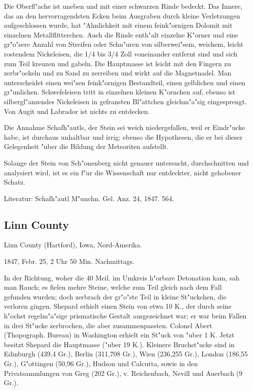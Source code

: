 \documentclass[a4paper, 11pt, oneside]{article}
\begin{document}
Die Oberfl"ache ist uneben und mit einer schwarzen Rinde bedeckt. Das Innere, das an den hervorragendsten Ecken beim Ausgraben durch kleine Verletzungen aufgeschlossen wurde, hat "Ahnlichkeit mit einem feink"ornigen Dolomit mit einzelnen Metallflitterchen. Auch die Rinde enth"alt einzelne K"orner und eine gr"o"sere Anzahl von Streifen oder Schn"uren von silberwei"sem, weichem, leicht rostendem Nickeleisen, die 1/4 bis 3/4 Zoll voneinander entfernt sind und sich zum Teil kreuzen und gabeln. Die Hauptmasse ist leicht mit den Fingern zu zerbr"ockeln und zu Sand zu zerreiben und wirkt auf die Magnetnadel. Man unterscheidet einen wei"sen feink"ornigen Bestandteil, einen gelblichen und einen gr"unlichen. Schwefeleisen tritt in einzelnen kleinen K"ornchen auf, ebenso ist silbergl"anzendes Nickeleisen in gefransten Bl"attchen gleichm"a"sig eingesprengt. Von Augit und Labrador ist nichts zu entdecken.

Die Annahme Schafh"autls, der Stein sei weich niedergefallen, weil er Eindr"ucke habe, ist durchaus unhaltbar und irrig; ebenso die Hypothesen, die er bei dieser Gelegenheit "uber die Bildung der Meteoriten aufstellt.

Solange der Stein von Sch"onenberg nicht genauer untersucht, durchschnitten und analysiert wird, ist es ein f"ur die Wissenschaft nur entdeckter, nicht gehobener Schatz.

Literatur: Schafh"autl M"unchn. Gel. Anz. 24, 1847. 564.

\subsection{Linn County}

Linn County (Hartford), Iowa, Nord-Amerika.

1847, Febr. 25, 2 Uhr 50 Min. Nachmittags.

In der Richtung, woher die 40 Meil. im Umkreis h"orbare Detonation kam, sah man Rauch; es fielen mehre Steine, welche zum Teil gleich nach dem Fall gefunden wurden; doch zerbrach der gr"o"ste Teil in kleine St"uckchen, die verloren gingen. Shepard erhielt einen Stein von etwa 10 K., der durch seine h"ochst regelm"a"sige prismatische Gestalt ausgezeichnet war; er war beim Fallen in drei St"ucke zerbrochen, die aber zusammenpassten. Colonel Abert (Thopograph. Bureau) in Washington erhielt ein St"uck von "uber 1 K. Jetzt besitzt Shepard die Hauptmasse ("uber 19 K.). Kleinere Bruchst"ucke sind in Edinburgh (439,4 Gr.), Berlin (311,708 Gr.), Wien (236,255 Gr.), London (186,55 Gr.), G"ottingen (50,96 Gr.), Hudson und Calcutta, sowie in den Privatsammlungen von Greg (202 Gr.), v. Reichenbach, Nevill und Auerbach (9 Gr.).
\end{document}
